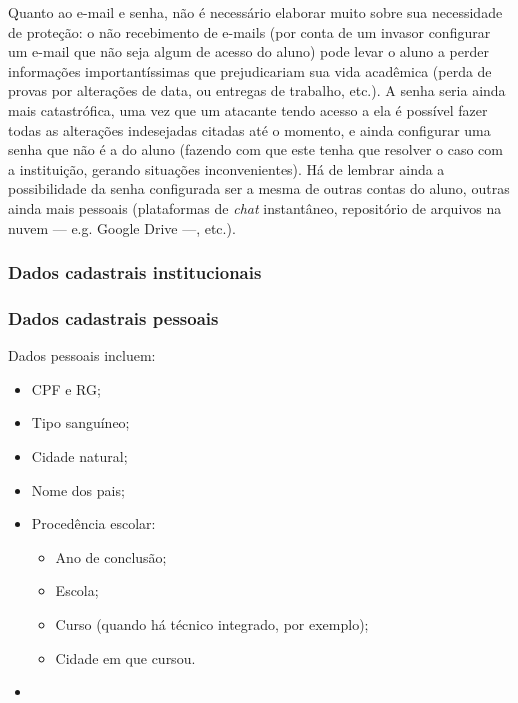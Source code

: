 \documentclass{article}
\newcommand{\todo}[1]{{\color{red}{#1}}}
\begin{document}
    Quanto ao e-mail e senha, não é necessário elaborar muito sobre sua
    necessidade de proteção: o não recebimento de e-mails (por conta de um
    invasor configurar um e-mail que não seja algum de acesso do aluno) pode
    levar o aluno a perder informações importantíssimas que prejudicariam sua
    vida acadêmica (perda de provas por alterações de data, ou entregas de
    trabalho, etc.). A senha seria ainda mais catastrófica, uma vez que um
    atacante tendo acesso a ela é possível fazer todas as alterações
    indesejadas citadas até o momento, e ainda configurar uma senha que não é a
    do aluno (fazendo com que este tenha que resolver o caso com a instituição,
    gerando situações inconvenientes). Há de lembrar ainda a possibilidade da
    senha configurada ser a mesma de outras contas do aluno, outras ainda mais
    pessoais (plataformas de \textit{chat} instantâneo, repositório de arquivos
    na nuvem --- e.g. Google Drive ---, etc.).

    \subsubsection{Dados cadastrais institucionais~\label{sub:data-inst}}

    \todo{TODO}

    \subsubsection{Dados cadastrais pessoais~\label{sub:data-pers}}

    Dados pessoais incluem:

    \begin{itemize}
        \item CPF e RG\@;
        \item Tipo sanguíneo;
        \item Cidade natural;
        \item Nome dos pais;
        \item Procedência escolar:
            \begin{itemize}
                \item Ano de conclusão;
                \item Escola;
                \item Curso (quando há técnico integrado, por exemplo);
                \item Cidade em que cursou.
            \end{itemize}
        \item
    \end{itemize}
\end{document}
